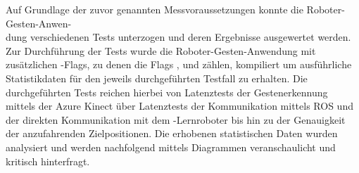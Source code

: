 Auf Grundlage der zuvor genannten Messvoraussetzungen konnte die Roboter-Gesten-Anwen-\\dung verschiedenen Tests unterzogen und deren Ergebnisse ausgewertet werden. Zur Durchführung der Tests wurde die Roboter-Gesten-Anwendung mit zusätzlichen -Flags, zu denen die Flags ,  und  zählen, kompiliert um ausführliche Statistikdaten für den jeweils durchgeführten Testfall zu erhalten. Die durchgeführten Tests reichen hierbei von Latenztests der Gestenerkennung mittels der Azure Kinect über Latenztests der Kommunikation mittels ROS und der direkten Kommunikation mit dem -Lernroboter bis hin zu der Genauigkeit der anzufahrenden Zielpositionen. Die erhobenen statistischen Daten wurden analysiert und werden nachfolgend mittels Diagrammen veranschaulicht und kritisch hinterfragt.










